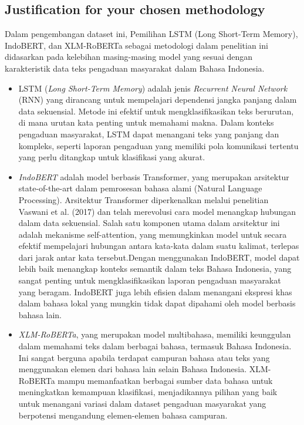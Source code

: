 \documentclass[12pt,a4paper]{article}
\begin{document}
\subsection{Justification for your chosen methodology}
\begin{adjustwidth}{3em}{0pt} 
\hspace{0.5cm} Dalam pengembangan dataset ini, Pemilihan LSTM (Long Short-Term Memory), IndoBERT, dan XLM-RoBERTa sebagai metodologi dalam penelitian ini didasarkan pada kelebihan masing-masing model yang sesuai dengan karakteristik data teks pengaduan masyarakat dalam Bahasa Indonesia.
\begin{itemize}
    \item LSTM (\textit{Long Short-Term Memory}) adalah jenis \textit{Recurrent Neural Network} (RNN) yang dirancang untuk mempelajari dependensi jangka panjang dalam data sekuensial. Metode ini efektif untuk mengklasifikasikan teks berurutan, di mana urutan kata penting untuk memahami makna. Dalam konteks pengaduan masyarakat, LSTM dapat menangani teks yang panjang dan kompleks, seperti laporan pengaduan yang memiliki pola komunikasi tertentu yang perlu ditangkap untuk klasifikasi yang akurat.
    \item \textit{IndoBERT} adalah model berbasis Transformer, yang merupakan arsitektur state-of-the-art dalam pemrosesan bahasa alami (Natural Language Processing). Arsitektur Transformer diperkenalkan melalui penelitian Vaswani et al. (2017) dan telah merevolusi cara model menangkap hubungan dalam data sekuensial. Salah satu komponen utama dalam arsitektur ini adalah mekanisme self-attention, yang memungkinkan model untuk secara efektif mempelajari hubungan antara kata-kata dalam suatu kalimat, terlepas dari jarak antar kata tersebut.Dengan menggunakan IndoBERT, model dapat lebih baik menangkap konteks semantik dalam teks Bahasa Indonesia, yang sangat penting untuk mengklasifikasikan laporan pengaduan masyarakat yang beragam. IndoBERT juga lebih efisien dalam menangani ekspresi khas dalam bahasa lokal yang mungkin tidak dapat dipahami oleh model berbasis bahasa lain. 
    \item \textit{XLM-RoBERTa}, yang merupakan model multibahasa, memiliki keunggulan dalam memahami teks dalam berbagai bahasa, termasuk Bahasa Indonesia. Ini sangat berguna apabila terdapat campuran bahasa atau teks yang menggunakan elemen dari bahasa lain selain Bahasa Indonesia. XLM-RoBERTa mampu memanfaatkan berbagai sumber data bahasa untuk meningkatkan kemampuan klasifikasi, menjadikannya pilihan yang baik untuk menangani variasi dalam dataset pengaduan masyarakat yang berpotensi mengandung elemen-elemen bahasa campuran.
\end{itemize}
\end{adjustwidth}
\end{document}
